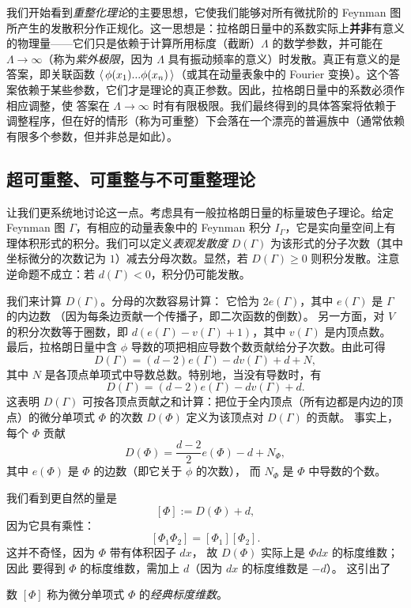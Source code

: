 我们开始看到\emph{重整化理论}的主要思想，它使我们能够对所有微扰阶的 Feynman 图所产生的发散积分作正规化。这一思想是：拉格朗日量中的系数实际上\textbf{并非}有意义的物理量——它们只是依赖于计算所用标度（截断）$\Lambda$ 的数学参数，并可能在 $\Lambda\to \infty$（称为\emph{紫外极限}，因为 $\Lambda$ 具有振动频率的意义）时发散。真正有意义的是答案，即关联函数 $\langle\, \phi(x_1)...\phi(x_n)\,\rangle$（或其在动量表象中的 Fourier 变换）。这个答案依赖于某些参数，它们才是理论的真正参数。因此，拉格朗日量中的系数必须作相应调整，使
答案在 $\Lambda\to \infty$ 时有有限极限。我们最终得到的具体答案将依赖于调整程序，但在好的情形（称为可重整）下会落在一个漂亮的普遍族中（通常依赖有限多个参数，但并非总是如此）。

\subsection{超可重整、可重整与不可重整理论}
让我们更系统地讨论这一点。考虑具有一般拉格朗日量的标量玻色子理论。给定
Feynman 图 $\Gamma$，有相应的动量表象中的 Feynman 积分 $I_\Gamma$，它是实向量空间上有理体积形式的积分。我们可以定义\emph{表观发散度} $D(\Gamma)$ 为该形式的分子次数（其中坐标微分的次数记为 $1$）减去分母次数。显然，若 $D(\Gamma)\ge 0$ 则积分发散。注意逆命题不成立：若 $d(\Gamma)<0$，积分仍可能发散。

我们来计算 $D(\Gamma)$。分母的次数容易计算：
它恰为 $2e(\Gamma)$，其中 $e(\Gamma)$ 是 $\Gamma$ 的内边数
（因为每条边贡献一个传播子，即二次函数的倒数）。
另一方面，对 $V$ 的积分次数等于圈数，即
$d(e(\Gamma)-v(\Gamma)+1)$，其中 $v(\Gamma)$ 是内顶点数。
最后，拉格朗日量中含 $\phi$ 导数的项把相应导数个数贡献给分子次数。由此可得
$$
D(\Gamma)=(d-2)e(\Gamma)-dv(\Gamma)+d+N,
$$
其中 $N$ 是各顶点单项式中导数总数。特别地，当没有导数时，有
$$
D(\Gamma)=(d-2)e(\Gamma)-dv(\Gamma)+d.
$$
这表明 $D(\Gamma)$ 可按各顶点贡献之和计算：把位于全内顶点（所有边都是内边的顶点）的微分单项式 $\Phi$ 的次数 $D(\Phi)$ 定义为该顶点对 $D(\Gamma)$ 的贡献。
事实上，每个 $\Phi$ 贡献
$$
D(\Phi)=\frac{d-2}{2}e(\Phi)-d+N_\Phi,
$$
其中 $e(\Phi)$ 是 $\Phi$ 的边数（即它关于 $\phi$ 的次数），
而 $N_\Phi$ 是 $\Phi$ 中导数的个数。

我们看到更自然的量是
$$
[\Phi]:=D(\Phi)+d,
$$
因为它具有乘性：
$$
[\Phi_1\Phi_2]=[\Phi_1][\Phi_2].
$$
这并不奇怪，因为 $\Phi$ 带有体积因子 $dx$，
故 $D(\Phi)$ 实际上是 $\Phi dx$ 的标度维数；因此
要得到 $\Phi$ 的标度维数，需加上
$d$（因为 $dx$ 的标度维数是 $-d$）。
这引出了

\begin{definition} 数 $[\Phi]$ 称为微分单项式 $\Phi$ 的\emph{经典标度维数}。
\end{definition}

